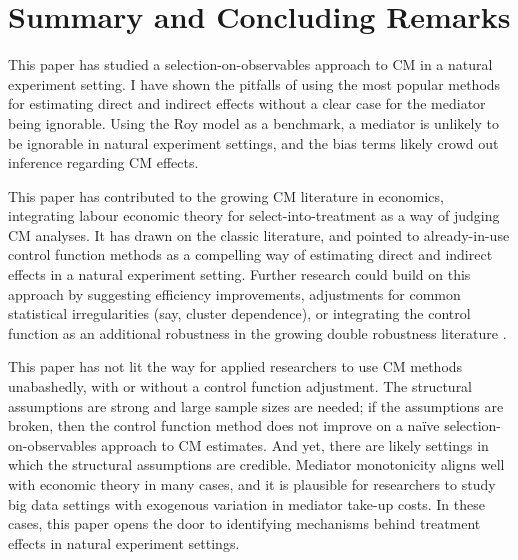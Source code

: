 \section{Summary and Concluding Remarks}
\label{sec:conclusion}

This paper has studied a selection-on-observables approach to CM in a natural experiment setting.
I have shown the pitfalls of using the most popular methods for estimating direct and indirect effects without a clear case for the mediator being ignorable.
Using the Roy model as a benchmark, a mediator is unlikely to be ignorable in natural experiment settings, and the bias terms likely crowd out inference regarding CM effects.

This paper has contributed to the growing CM literature in economics, integrating labour economic theory for select-into-treatment as a way of judging CM analyses.
It has drawn on the classic literature, and pointed to already-in-use control function methods as a compelling way of estimating direct and indirect effects in a natural experiment setting.
Further research could build on this approach by suggesting efficiency improvements, adjustments for common statistical irregularities (say, cluster dependence), or integrating the control function as an additional robustness in the growing double robustness literature \citep{farbmacher2022causal,bia2024double}.

This paper has not lit the way for applied researchers to use CM methods unabashedly, with or without a control function adjustment.
The structural assumptions are strong and large sample sizes are needed; if the assumptions are broken, then the control function method does not improve on a na\"ive selection-on-observables approach to CM estimates.
And yet, there are likely settings in which the structural assumptions are credible.
Mediator monotonicity aligns well with economic theory in many cases, and it is plausible for researchers to study big data settings with exogenous variation in mediator take-up costs.
In these cases, this paper opens the door to identifying mechanisms behind treatment effects in natural experiment settings.
